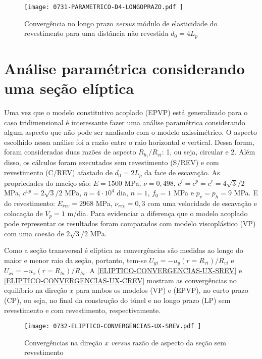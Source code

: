 \begin{figure}[H]
	\begin{center}
		\texttt{[image: 0731-PARAMETRICO-D4-LONGOPRAZO.pdf
		]}
	\end{center}
	\caption{\label{PARAMETRICO-D4-LONGOPRAZO}Convergência no longo prazo \textit{versus} módulo de elasticidade do revestimento para uma distância não revestida $d_0=4L_p$}
\end{figure}

\section{Análise paramétrica considerando uma seção elíptica}

Uma vez que o modelo constitutivo acoplado (EPVP) está generalizado para o caso tridimensional é interessante fazer uma análise paramétrica considerando algum aspecto que não pode ser analisado com o modelo axissimétrico. O aspecto escolhido nessa análise foi a razão entre o raio horizontal e vertical. Dessa forma, foram consideradas duas razões de aspecto $R_{h_i}/R_{vi}$: 1, ou seja, circular e 2. Além disso, os cálculos foram executados sem revestimento (S/REV) e com revestimento (C/REV) afastado de $d_0=2L_p$ da face de escavação. As propriedades do maciço são: $E=1500$ MPa, $\nu=0,498$, $c^i=c^p=c^r =4\sqrt{3}/2$ MPa, $c^{vp}=2\sqrt{3}/2$ MPa, $\eta = 4 \cdot 10^4$ dia, $n=1$, $f_0=1$ MPa e $p_v=p_h=9$ MPa. E do revestimento: $E_{rev}=2968$ MPa, $\nu_{rev}=0,3$ com uma velocidade de escavação e colocação de $V_p=1$ m/dia. Para evidenciar a diferença que o modelo acoplado pode representar os resultados foram comparados com modelo viscoplástico (VP) com uma coesão de $2\sqrt{3}/2$ MPa.

Como a seção transversal é elíptica as convergências são medidas ao longo do maior e menor raio da seção, portanto,  tem-se $U_{yi} = -u_y(r=R_{vi})/R_{vi}$ e $U_{xi} = -u_x(r=R_{hi})/R_{hi}$.  A \autoref{ELIPTICO-CONVERGENCIAS-UX-SREV} e \autoref{ELIPTICO-CONVERGENCIAS-UX-CREV} mostram as convergências no equilíbrio na direção $x$ para ambos os modelos (VP) e (EPVP), no curto prazo (CP), ou seja, no final da construção do túnel e no longo prazo (LP) sem revestimento e com revestimento, respectivamente.


\begin{figure}[H]
	\begin{center}
		\texttt{[image: 0732-ELIPTICO-CONVERGENCIAS-UX-SREV.pdf
		]}
	\end{center}
	\caption{\label{ELIPTICO-CONVERGENCIAS-UX-SREV}Convergências na direção $x$ \textit{versus} razão de aspecto da seção sem revestimento}
\end{figure}

